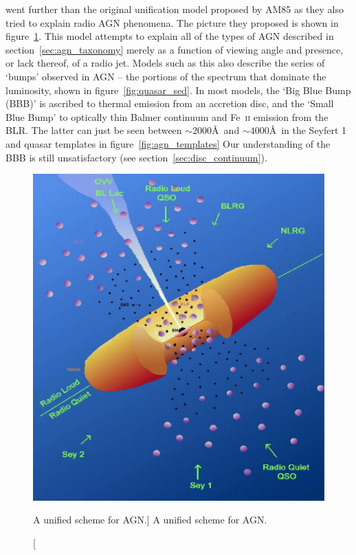 \cite[][UP95]{UP95} went further than the original unification model
proposed by AM85 as they also tried to explain radio AGN phenomena.
The picture they proposed is shown in figure~\ref{fig:unification}.
This model attempts to explain all of the types of AGN described in
section~\ref{sec:agn_taxonomy} merely as a function of viewing angle
and presence, or lack thereof, of a radio jet. Models such as this also 
describe the series of `bumps' observed in AGN -- the portions
of the spectrum that dominate the luminosity, shown in figure~\ref{fig:quasar_sed}. 
In most models, the `Big Blue Bump (BBB)' is ascribed to thermal 
emission from an accretion disc, and the `Small Blue Bump' to optically 
thin Balmer continuum and Fe~\textsc{ii} emission from the BLR.
The latter can just be seen between $\sim2000$\AA\ and 
$\sim4000$\AA\ in the Seyfert 1 and 
quasar templates in figure~\ref{fig:agn_templates}
Our understanding of the BBB is still unsatisfactory 
(see section~\ref{sec:disc_continuum}).

\begin{figure}
\centering
\includegraphics[width=1.0\textwidth]{figures/01-intro/up95.png}
\caption
[A unified scheme for AGN.]
{
A unified scheme for AGN.
} 
\label{fig:unification}
\end{figure} 

